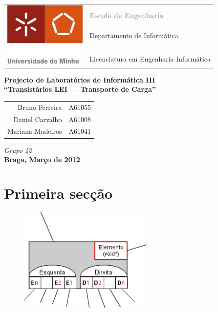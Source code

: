 \documentclass[a5paper,twocolumn, 11pt]{article}
\begin{document}
\onecolumn
\thispagestyle{empty}
\begin{tabular}{ll}
    \multirow{7}{*}{ \includegraphics[height=90pt]{logo.jpeg} }
    &\\
    & \textcolor{DarkGray}{\Large{\textbf{Escola de Engenharia}}} \\
    &\\
    & \large{Departamento de Informática}\\
    &\\
    &\\
    & \large{Licenciatura em Engenharia Informática}\\
\end{tabular}
\begin{center}
    \Large{\textbf{Projecto de Laboratórios de Informática III}}\\
    \vspace{20pt}
    \Large{\textbf{``Transistários LEI --- Transporte de Carga''}}\\
    \vspace{15pt}
    \begin{tabular}{r@{, }l}
        Bruno Ferreira&A61055\\
        Daniel Carvalho&A61008\\
        Mariana Madeiros&A61041\\
    \end{tabular}
    
    \vspace{5pt}
    \emph{Grupo 42}\\\vspace{15pt}
    \large{\textbf{Braga, Março de 2012}}
\end{center}

\newpage
\tableofcontents

\newpage
\twocolumn
\section{Primeira secção}
\lipsum[1-2]
\begin{figure}[htb!]
    \includegraphics[width=190pt]{image2.png}
\end{figure}
\lipsum[1-3]
\end{document}
